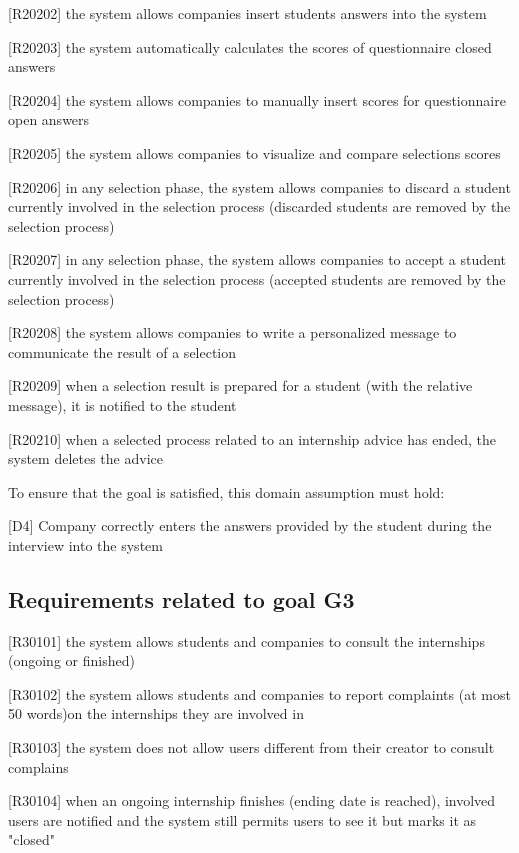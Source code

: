 		[R20202] the system allows companies insert students answers into the system
		
		[R20203] the system automatically calculates the scores of questionnaire closed answers
		
		[R20204] the system allows companies to manually insert scores for questionnaire open answers
		
		[R20205] the system allows companies to visualize and compare selections scores
		
		[R20206] in any selection phase, the system allows companies to discard a student currently involved in the selection process (discarded students are removed by the selection process)
		
		[R20207] in any selection phase, the system allows companies to accept a student currently involved in the selection process (accepted students are removed by the selection process)
		
		[R20208] the system allows companies to write a personalized message to communicate the result of a selection
		
		[R20209] when a selection result is prepared for a student (with the relative message), it is notified to the student
		
		[R20210] when a selected process related to an internship advice has ended, the system deletes the advice
		
		To ensure that the goal is satisfied, this domain assumption must hold:
		
		
		[D4] Company correctly enters the answers provided by the student during the interview into the system
		
		\subsection{Requirements related to goal G3}
		
		[R30101] the system allows students and companies to consult the internships (ongoing or finished)
		
		[R30102] the system allows students and companies to report complaints (at most 50 words)on the internships they are involved in
		
		[R30103] the system does not allow users different from their creator to consult complains
		
		[R30104] when an ongoing internship finishes (ending date is reached), involved users are notified and the system still permits users to see it but marks it as "closed"
		
